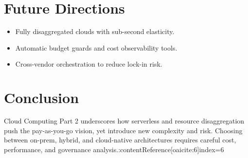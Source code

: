 \documentclass[11pt]{article}
\begin{document}
\section{Future Directions}

\begin{itemize}[itemsep=0pt]
  \item Fully disaggregated clouds with sub-second elasticity.
  \item Automatic budget guards and cost observability tools.
  \item Cross-vendor orchestration to reduce lock-in risk.
\end{itemize}

\section*{Conclusion}

Cloud Computing Part 2 underscores how serverless and resource disaggregation push the pay-as-you-go vision, yet introduce new complexity and risk.  
Choosing between on-prem, hybrid, and cloud-native architectures requires careful cost, performance, and governance analysis.:contentReference[oaicite:6]{index=6}
\end{document}
